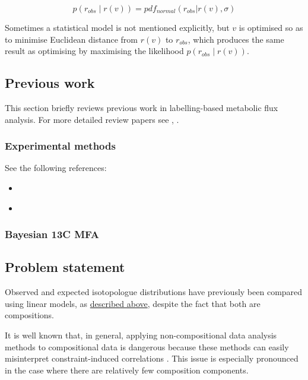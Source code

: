 \documentclass{article}
\def\tightlist{}
\begin{document}
\[
p(r_{obs}\mid r(v)) = pdf_{normal}(r_{obs} | r(v), \sigma)
\label{linear}
\]

Sometimes a statistical model is not mentioned explicitly, but \(v\) is
optimised so as to minimise Euclidean distance from \(r(v)\) to
\(r_{obs}\), which produces the same result as optimising by maximising
the likelihood \hyperref[linear]{\(p(r_{obs}\mid r(v))\)}.

\subsection{Previous work}\label{previous-work}

This section briefly reviews previous work in labelling-based metabolic
flux analysis. For more detailed review papers see
\citep{daiUnderstandingMetabolismFlux2017},
\citep{falcoMetabolicFluxAnalysis2022}.

\subsubsection{Experimental methods}\label{experimental-methods}

See the following references:

\begin{itemize}
\tightlist
\item
  \citep{longHighresolution13CMetabolic2019}
\item
  \citep{falcoMetabolicFluxAnalysis2022}
\end{itemize}

\subsubsection{Bayesian 13C MFA}\label{bayesian-13c-mfa}

\subsection{Problem statement}\label{problem-statement}

Observed and expected isotopologue distributions have previously been
compared using linear models, as \hyperref[linear]{described above},
despite the fact that both are compositions.

It is well known that, in general, applying non-compositional data
analysis methods to compositional data is dangerous because these
methods can easily misinterpret constraint-induced correlations
\citep[Ch. 3]{aitchisonjStatisticalAnalysisCompositional}. This issue is
especially pronounced in the case where there are relatively few
composition components.
\end{document}
